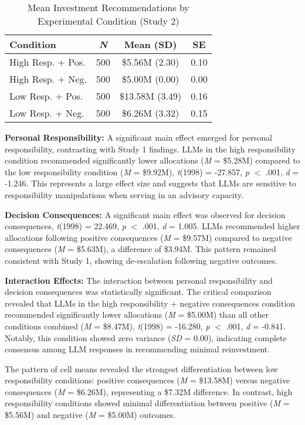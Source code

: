 \documentclass[letterpaper]{article} %
\begin{document}
\begin{table}[h]
\centering
\small %
\caption{Mean Investment Recommendations by Experimental Condition (Study 2)}
\label{tab:study-2-table}
\begin{tabular}{lccc}
\hline
Condition & \textit{N} & Mean (SD) & SE \\
\hline
High Resp. + Pos. & 500 & \$5.56M (2.30) & 0.10 \\
High Resp. + Neg. & 500 & \$5.00M (0.00) & 0.00 \\
Low Resp. + Pos. & 500 & \$13.58M (3.49) & 0.16 \\
Low Resp. + Neg. & 500 & \$6.26M (3.32) & 0.15 \\
\hline
\end{tabular}
\end{table}

\textbf{Personal Responsibility:} A significant main effect emerged for personal responsibility, contrasting with Study 1 findings. LLMs in the high responsibility condition recommended significantly lower allocations (\textit{M} = \$5.28M) compared to the low responsibility condition (\textit{M} = \$9.92M), \textit{t}(1998) = -27.857, \textit{p} $<$ .001, \textit{d} = -1.246. This represents a large effect size and suggests that LLMs are sensitive to responsibility manipulations when serving in an advisory capacity.

\textbf{Decision Consequences:} A significant main effect was observed for decision consequences, \textit{t}(1998) = 22.469, \textit{p} $<$ .001, \textit{d} = 1.005. LLMs recommended higher allocations following positive consequences (\textit{M} = \$9.57M) compared to negative consequences (\textit{M} = \$5.63M), a difference of \$3.94M. This pattern remained consistent with Study 1, showing de-escalation following negative outcomes.

\textbf{Interaction Effects:} The interaction between personal responsibility and decision consequences was statistically significant. The critical comparison revealed that LLMs in the high responsibility + negative consequences condition recommended significantly lower allocations (\textit{M} = \$5.00M) than all other conditions combined (\textit{M} = \$8.47M), \textit{t}(1998) = -16.280, \textit{p} $<$ .001, \textit{d} = -0.841. Notably, this condition showed zero variance (\textit{SD} = 0.00), indicating complete consensus among LLM responses in recommending minimal reinvestment.

The pattern of cell means revealed the strongest differentiation between low responsibility conditions: positive consequences (\textit{M} = \$13.58M) versus negative consequences (\textit{M} = \$6.26M), representing a \$7.32M difference. In contrast, high responsibility conditions showed minimal differentiation between positive (\textit{M} = \$5.56M) and negative (\textit{M} = \$5.00M) outcomes.
\end{document}
